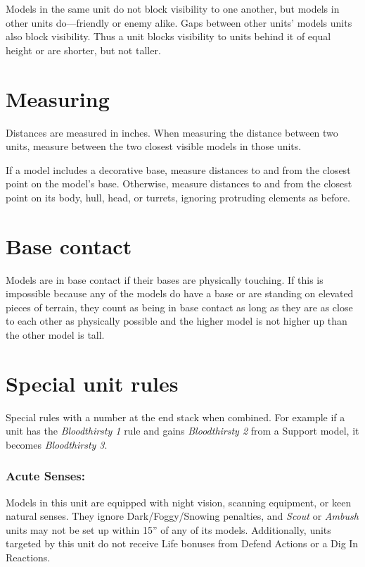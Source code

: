\begin{multicols}{2}
Models in the same unit do not block visibility to one another, but models in other units do—friendly or enemy alike. Gaps between other units' models units also block visibility. Thus a unit blocks visibility to units behind it of equal height or are shorter, but not taller.




\section*{Measuring}

Distances are measured in inches. When measuring the distance between two units, measure between the two closest visible models in those units.

If a model includes a decorative base, measure distances to and from the closest point on the model's base. Otherwise, measure distances to and from the closest point on its body, hull, head, or turrets, ignoring protruding elements as before.






\section*{Base contact}

Models are in base contact if their bases are physically touching. If this is impossible because any of the models do have a base or are standing on elevated pieces of terrain, they count as being in base contact as long as they are as close to each other as physically possible and the higher model is not higher up than the other model is tall.




\section*{Special unit rules}

Special rules with a number at the end stack when combined. For example if a unit has the \textit{Bloodthirsty 1} rule and gains \textit{Bloodthirsty 2} from a Support model, it becomes \textit{Bloodthirsty 3}.

\subsubsection*{Acute Senses:} Models in this unit are equipped with night vision, scanning equipment, or keen natural senses. They ignore Dark/Foggy/Snowing penalties, and \textit{Scout} or \textit{Ambush} units may not be set up within 15'' of any of its models. Additionally, units targeted by this unit do not receive Life bonuses from Defend Actions or a Dig In Reactions.


\end{multicols}
